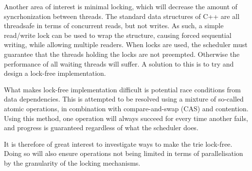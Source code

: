 Another area of interest is minimal locking, which will decrease the amount of
syncrhonization between threads. The standard data structures of C++ are all
threadsafe in terms of concurrent reads, but not writes. As such, a simple
read/write lock can be used to wrap the structure, causing forced sequential
writing, while allowing multiple readers. When locks are used, the scheduler
must guarantee that the threads holding the locks are not preempted. Otherwise
the performance of all waiting threads will suffer. A solution to this is to
try and design a lock-free implementation.\cite{Shavit:2011}

What makes lock-free implementation difficult is potential race conditions from
data dependencies. This is attempted to be resolved using a
mixture of so-called atomic operations, in combination with compare-and-swap
(CAS) and contention. Using this method, one operation will always succeed for
every time another fails, and progress is guaranteed regardless of what the
scheduler does\cite{Shavit:2011}.

It is therefore of great interest to investigate ways to make the trie lock-free.
Doing so will also ensure operations not being limited in terms of parallelisation
by the granularity of the locking mechanisms.
